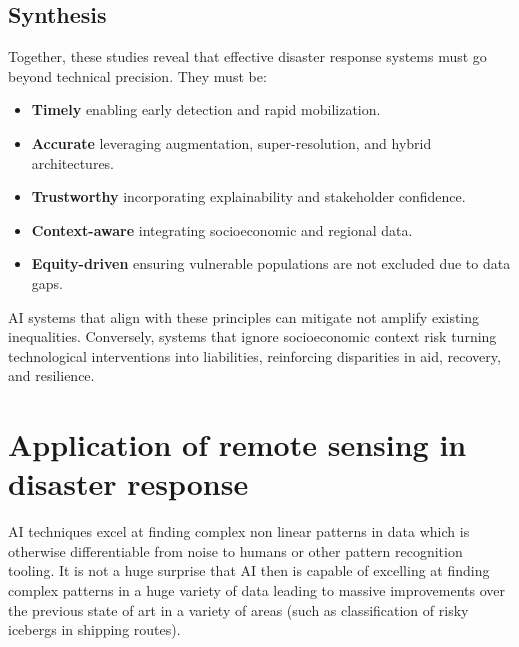 \documentclass[conference,a4paper]{IEEEtran}
\begin{document}
\subsection{Synthesis}

Together, these studies reveal that effective disaster response systems must go beyond technical precision. They must be:

\begin{itemize}
    \item \textbf{Timely} enabling early detection and rapid mobilization.
    \item \textbf{Accurate} leveraging augmentation, super-resolution, and hybrid architectures.
    \item \textbf{Trustworthy} incorporating explainability and stakeholder confidence.
    \item \textbf{Context-aware} integrating socioeconomic and regional data.
    \item \textbf{Equity-driven} ensuring vulnerable populations are not excluded due to data gaps.
\end{itemize}

AI systems that align with these principles can mitigate not amplify existing inequalities. Conversely, systems that ignore socioeconomic context risk turning technological interventions into liabilities, reinforcing disparities in aid, recovery, and resilience.


\section{Application of remote sensing in disaster response}


AI techniques excel at finding complex non linear patterns in data which is otherwise differentiable from noise to humans or other pattern recognition tooling. It is not a huge surprise that AI then is capable of excelling at finding complex patterns in a huge variety of data leading to massive improvements over the previous state of art in a variety of areas (such as classification of risky icebergs in shipping routes).
\end{document}
